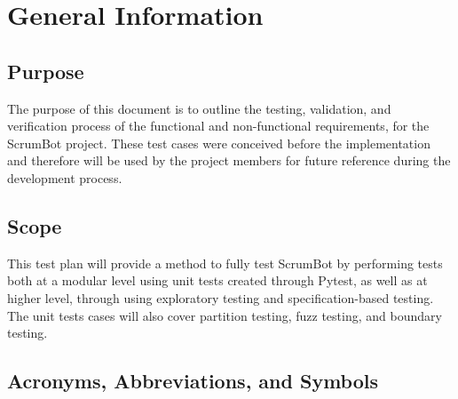 \documentclass[12pt, titlepage]{article}
\begin{document}

\section{General Information}

\subsection{Purpose}
The purpose of this document is to outline the testing, validation, and verification process of the functional and non-functional requirements, for the ScrumBot project. These test cases were conceived before the implementation and therefore will be used by the project members for future reference during the development process.

\subsection{Scope}
This test plan will provide a method to fully test ScrumBot by performing tests both at a modular level using unit tests created through Pytest, as well as at higher level, through using exploratory testing and specification-based testing. The unit tests cases will also cover partition testing, fuzz testing, and boundary testing.

\subsection{Acronyms, Abbreviations, and Symbols}
	
\end{document}
